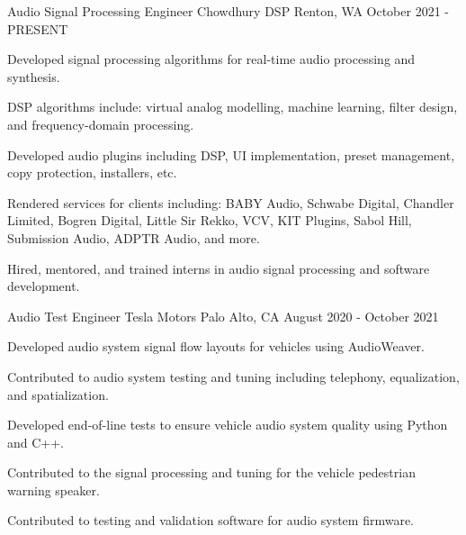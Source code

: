 

\begin{cventries}

  \cventry
    {Audio Signal Processing Engineer} %
    {Chowdhury DSP} %
    {Renton, WA} %
    {October 2021 - PRESENT} %
    {
      \begin{cvitems} %
        \item {Developed signal processing algorithms for real-time audio processing and synthesis.}
        \item {DSP algorithms include: virtual analog modelling, machine learning, filter design, and frequency-domain processing.}
        \item {Developed audio plugins including DSP, UI implementation, preset management, copy protection, installers, etc.}
        \item {Rendered services for clients including: BABY Audio, Schwabe Digital, Chandler Limited, Bogren Digital,
               Little Sir Rekko, VCV, KIT Plugins, Sabol Hill, Submission Audio, ADPTR Audio, and more.}
        \item {Hired, mentored, and trained interns in audio signal processing and software development.}
      \end{cvitems}
    }

  \cventry
    {Audio Test Engineer} %
    {Tesla Motors} %
    {Palo Alto, CA} %
    {August 2020 - October 2021} %
    {
      \begin{cvitems} %
        \item {Developed audio system signal flow layouts for vehicles using AudioWeaver.}
        \item {Contributed to audio system testing and tuning including telephony, equalization, and spatialization.}
        \item {Developed end-of-line tests to ensure vehicle audio system quality using Python and C++.}
        \item {Contributed to the signal processing and tuning for the vehicle pedestrian warning speaker.}
        \item {Contributed to testing and validation software for audio system firmware.}
      \end{cvitems}
    }


\end{cventries}
